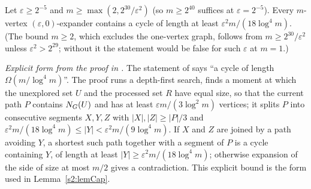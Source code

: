 \begin{citedresult}\label{s1:citLem25}
Let $\varepsilon\ge2^{-5}$ and $m\ge\max(2,2^{30}/\varepsilon^2)$ (so
$m\ge2^{40}$ suffices at $\varepsilon=2^{-5}$). Every $m$-vertex
$(\varepsilon,0)$-expander contains a cycle of length at least
$\varepsilon^2m/(18\log^4m)$. (The bound $m\ge2$, which excludes the
one-vertex graph, follows from $m\ge2^{30}/\varepsilon^2$ unless
$\varepsilon^2>2^{29}$; without it the statement would be false for such
$\varepsilon$ at $m=1$.)

\emph{Explicit form from the proof in \cite{BM}.} The statement of \cite{BM}
says ``a cycle of length $\Omega(m/\log^4m)$''. The proof runs a depth-first
search, finds a moment at which the unexplored set $U$ and the processed set $R$
have equal size, so that the current path $P$ contains
$N_G(U)$ and has at least $\varepsilon m/(3\log^2m)$ vertices; it splits $P$
into consecutive segments $X,Y,Z$ with $|X|,|Z|\ge|P|/3$ and
$\varepsilon^2m/(18\log^4m)\le|Y|<\varepsilon^2m/(9\log^4m)$. If $X$ and $Z$
are joined by a path avoiding $Y$, a shortest such path together with a segment
of $P$ is a cycle containing $Y$, of length at least $|Y|\ge
\varepsilon^2m/(18\log^4m)$; otherwise expansion of the side of size at most
$m/2$ gives a contradiction. This explicit bound is the form used in
Lemma~\ref{s2:lemCap}.
\end{citedresult}


